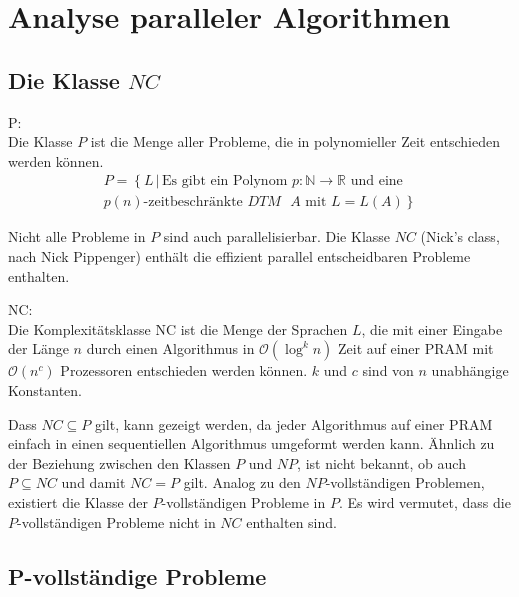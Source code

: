 \section{Analyse paralleler Algorithmen}

\subsection{Die Klasse $NC$}
\begin{define}
    P: \\
    Die Klasse $P$ ist die Menge aller Probleme, die in polynomieller Zeit entschieden werden können.
    \begin{equation}
        \begin{split}
            P = \left\{ L \, | \, \text{Es gibt ein Polynom } p\colon \mathbb{N} \to \mathbb{R} \right.
            \text{ und eine} \\ \left. \text{$p(n)$-zeitbeschränkte $DTM$ $A$ mit } L = L(A) \right\}
        \end{split}
    \end{equation}\cite[S.205]{fgi1}
\end{define}
Nicht alle Probleme in $P$ sind auch parallelisierbar.
Die Klasse $NC$ (Nick's class, nach Nick Pippenger) enthält die effizient parallel
entscheidbaren Probleme enthalten.
\begin{define}
    NC: \\
    Die Komplexitätsklasse NC ist die Menge der Sprachen $L$,
    die mit einer Eingabe der Länge $n$ durch einen Algorithmus
    in $\mathcal{O}\left( \log^k n \right)$ Zeit auf einer PRAM
    mit $\mathcal{O}\left( n^c \right)$ Prozessoren entschieden werden können.
    $k$ und $c$ sind von $n$ unabhängige Konstanten.
\end{define}
Dass $NC \subseteq P$ gilt, kann gezeigt werden, da jeder Algorithmus auf einer PRAM
einfach in einen sequentiellen Algorithmus umgeformt werden kann.
Ähnlich zu der Beziehung zwischen den Klassen $P$ und $NP$, ist nicht bekannt,
ob auch $P \subseteq NC$ und damit $NC = P$ gilt.
Analog zu den $NP$-vollständigen Problemen, existiert die Klasse der $P$-vollständigen Probleme in $P$.
Es wird vermutet, dass die $P$-vollständigen Probleme nicht in $NC$ enthalten sind.
\cite[S.535]{jaja}

\subsection{P-vollständige Probleme}
